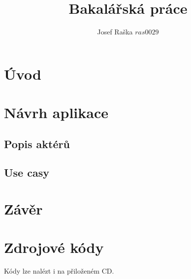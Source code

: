 \documentclass{article}
\title{Bakalářská práce}
\author{Josef Raška \(ras0029\)}
\numberwithin{equation}{section}
\begin{document}
{}

\tableofcontents
\listoffigures
\listoftables

\newpage

\section{Úvod}

\section{Návrh aplikace}
\subsection{Popis aktérů}
\subsection{Use casy}






\section{Závěr}


\begin{thebibliography}{99}

\end{thebibliography}

  \appendix

  \section{Zdrojové kódy}
  Kódy lze nalézt i na přiloženém CD.
\end{document}
